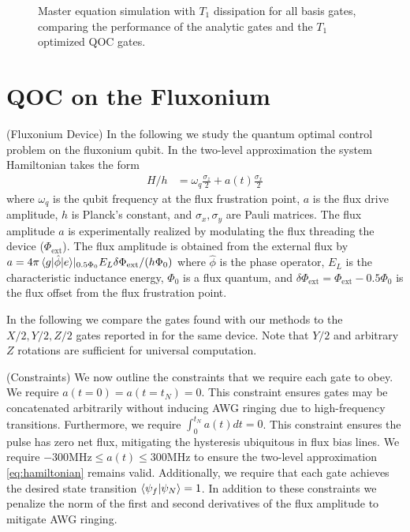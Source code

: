 \documentclass[
  amsfonts,
  amsmath,
  tbtags,
  amssymb,
  aps,
  nobibnotes,
  twocolumn,
]{revtex4-2}
\begin{document}
\begin{figure}[ht]
\begin{subfigure}{.3\linewidth}
    \label{fig:sub-third}
  \end{subfigure}
  \caption{Master equation simulation with $T_{1}$ dissipation for all basis gates,
    comparing the performance of the analytic gates and the $T_{1}$ optimized QOC gates.}
  \label{fig:fig}
\end{figure}

\section{QOC on the Fluxonium}
(Fluxonium Device) In the following we study
the quantum optimal control problem on the fluxonium qubit.
In the two-level
approximation the system Hamiltonian takes the form
\label{eq:hamiltonian}
\begin{align}
  H/h &= \omega_{q} \frac{\sigma_{z}}{2} + a(t) \frac{\sigma_{x}}{2}
\end{align}
where $\omega_{q}$ is the qubit frequency at the flux frustration point,
$a$ is the flux drive amplitude, $h$ is Planck's constant, and $\sigma_{x}, \sigma_{y}$
are Pauli matrices. The flux amplitude $a$ is experimentally
realized by modulating the flux 
threading the device ($\Phi_{\textrm{ext}}$).
The flux amplitude is obtained from the external flux by
$a = 4 \pi \braket{g \lvert \hat{\phi} \rvert e} \rvert_{0.5 \Phi_{0}} E_{L}
\delta \Phi_{\textrm{ext}} / (h \Phi_{0})$
where $\hat{\phi}$ is the phase operator, $E_{L}$ is the characteristic inductance energy, $\Phi_{0}$
is a flux quantum, and
$\delta \Phi_{\textrm{ext}} = \Phi_{\textrm{ext}} - 0.5 \Phi_{0}$ is the flux
offset from the flux frustration point.

In the following we compare the gates found with our methods
to the $X/2, Y/2, Z/2$ gates reported in \cite{zhang2020universal}
for the same device. Note that $Y/2$ and arbitrary $Z$ rotations
are sufficient for universal computation.

(Constraints) We now outline the constraints that we require each gate
to obey.
We require $a(t = 0) = a(t = t_{N}) = 0$.
This constraint ensures gates may be concatenated arbitrarily without
inducing AWG ringing due to high-frequency transitions.
Furthermore, we require $\int_{0}^{t_{N}} a(t) dt = 0$. This
constraint ensures the pulse has zero net flux, mitigating
the hysteresis ubiquitous in flux bias lines.
We require $-300 \textrm{MHz} \le a(t) \le 300 \textrm{MHz}$
to ensure the two-level approximation \ref{eq:hamiltonian}
remains valid. Additionally, we require that each gate achieves
the desired state transition $\braket{\psi_{f} \lvert \psi_{N}} = 1$.
In addition to these constraints we penalize the norm
of the first and second derivatives of the flux amplitude
to mitigate AWG ringing.
\end{document}
